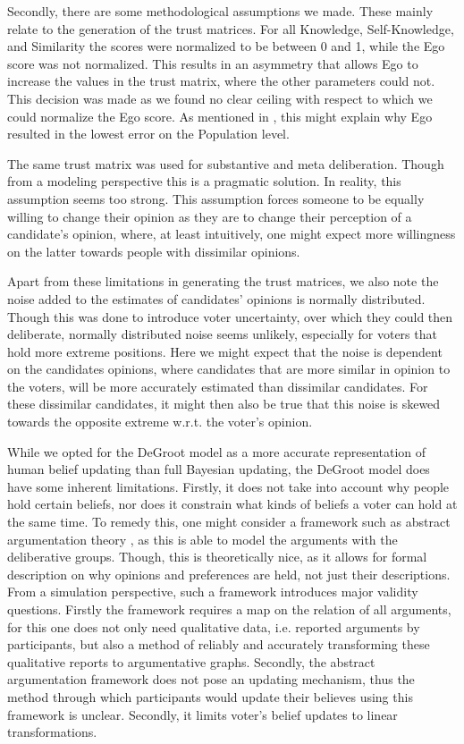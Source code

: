 Secondly, there are some methodological assumptions we made. These mainly
relate to the generation of the trust matrices. For all Knowledge,
Self-Knowledge, and Similarity the scores were normalized to be between 0 and
1, while the Ego score was not normalized. This results in an asymmetry that
allows Ego to increase the values in the trust matrix, where the other
parameters could not. This decision was made as we found no clear ceiling
with respect to which we could normalize the Ego score. As mentioned in ,
this might explain why Ego resulted in the lowest error on the Population level.

The same trust matrix was used for substantive and meta deliberation. Though
from a modeling perspective this is a pragmatic solution. In reality, this
assumption seems too strong. This assumption forces someone to be equally
willing to change their opinion as they are to change their perception of a
candidate's opinion, where, at least intuitively, one might expect more
willingness on the latter towards people with dissimilar opinions.


Apart from these limitations in generating the trust matrices, we also note the
noise added to the estimates of candidates' opinions is normally distributed.
Though this was done to introduce voter uncertainty, over which they could then
deliberate, normally distributed noise seems unlikely, especially for voters
that hold more extreme positions. Here we might expect that the noise is
dependent on the candidates opinions, where candidates that are more similar in
opinion to the voters, will be more accurately estimated than dissimilar
candidates. For these dissimilar candidates, it might then also be true that
this noise is skewed towards the opposite extreme w.r.t. the voter's opinion.

While we opted for the DeGroot model as a more accurate representation of human
belief updating than full Bayesian updating, the DeGroot model does have some
inherent limitations. Firstly, it does not take into account why people hold
certain beliefs, nor does it constrain what kinds of beliefs a voter can hold
at the same time. To remedy this, one might consider a framework such as
abstract argumentation theory \cite{dungAcceptabilityArgumentsIts1995}, as
this is able to model the arguments with the deliberative groups. Though, this
is theoretically nice, as it allows for formal description on why opinions and
preferences are held, not just their descriptions. From a simulation
perspective, such a framework introduces major validity questions. Firstly the
framework requires a map on the relation of all arguments, for this one does
not only need qualitative data, i.e. reported arguments by participants, but
also a method of reliably and accurately transforming these qualitative reports
to argumentative graphs. Secondly, the abstract argumentation framework does
not pose an updating mechanism, thus the method through which participants
would update their believes using this framework is unclear. Secondly, it limits
voter's belief updates to linear transformations.


